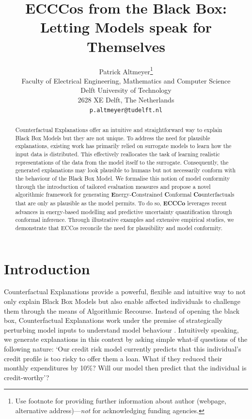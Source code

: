\documentclass{article}
\title{ECCCos from the Black Box: Letting Models speak for Themselves}
\author{%
  Patrick Altmeyer\thanks{Use footnote for providing further information
    about author (webpage, alternative address)---\emph{not} for acknowledging
    funding agencies.} \\
  Faculty of Electrical Engineering, Mathematics and Computer Science\\
  Delft University of Technology\\
  2628 XE Delft, The Netherlands \\
  \texttt{p.altmeyer@tudelft.nl} \\
}
\begin{document}
\maketitle


\begin{abstract}
  Counterfactual Explanations offer an intuitive and straightforward way to explain Black Box Models but they are not unique. To address the need for plausible explanations, existing work has primarily relied on surrogate models to learn how the input data is distributed. This effectively reallocates the task of learning realistic representations of the data from the model itself to the surrogate. Consequently, the generated explanations may look plausible to humans but not necessarily conform with the behaviour of the Black Box Model. We formalise this notion of model conformity through the introduction of tailored evaluation measures and propose a novel algorithmic framework for generating \textbf{E}nergy-\textbf{C}onstrained \textbf{C}onformal \textbf{Co}unterfactuals that are only as plausible as the model permits. To do so, \textbf{ECCCo} leverages recent advances in energy-based modelling and predictive uncertainty quantification through conformal inference. Through illustrative examples and extensive empirical studies, we demonstrate that ECCos reconcile the need for plausibility and model conformity. 
\end{abstract}

\section{Introduction}\label{intro}

Counterfactual Explanations provide a powerful, flexible and intuitive way to not only explain Black Box Models but also enable affected individuals to challenge them through the means of Algorithmic Recourse. Instead of opening the black box, Counterfactual Explanations work under the premise of strategically perturbing model inputs to understand model behaviour \citep{wachter2017counterfactual}. Intuitively speaking, we generate explanations in this context by asking simple what-if questions of the following nature: `Our credit risk model currently predicts that this individual's credit profile is too risky to offer them a loan. What if they reduced their monthly expenditures by 10\%? Will our model then predict that the individual is credit-worthy'? 
\end{document}
